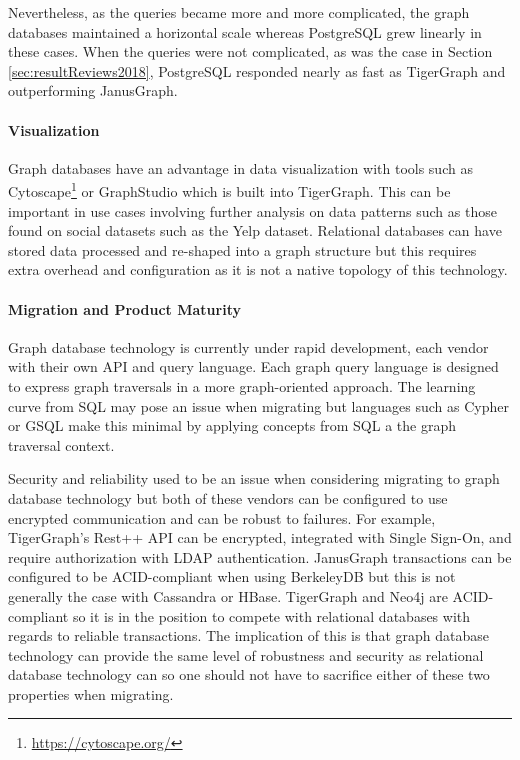 Nevertheless, as the queries became more and more complicated, the graph databases maintained a horizontal scale whereas PostgreSQL grew linearly in these cases. When the queries were not complicated, as was the case in Section \ref{sec:resultReviews2018}, PostgreSQL responded nearly as fast as TigerGraph and outperforming JanusGraph. 

\paragraph{Visualization}

Graph databases have an advantage in data visualization with tools such as Cytoscape\footnote{\url{https://cytoscape.org/}} or GraphStudio which is built into TigerGraph. This can be important in use cases involving further analysis on data patterns such as those found on social datasets such as the Yelp dataset. Relational databases can have stored data processed and re-shaped into a graph structure but this requires extra overhead and configuration as it is not a native topology of this technology.

\paragraph{Migration and Product Maturity}

Graph database technology is currently under rapid development, each vendor with their own API and query language. Each graph query language is designed to express graph traversals in a more graph-oriented approach. The learning curve from SQL may pose an issue when migrating but languages such as Cypher or GSQL make this minimal by applying concepts from SQL a the graph traversal context.

Security and reliability used to be an issue when considering migrating to graph database technology but both of these vendors can be configured to use encrypted communication and can be robust to failures. For example, TigerGraph's Rest++ API can be encrypted, integrated with Single Sign-On, and require authorization with LDAP authentication. JanusGraph transactions can be configured to be ACID-compliant when using BerkeleyDB but this is not generally the case with Cassandra or HBase. TigerGraph and Neo4j are ACID-compliant so it is in the position to compete with relational databases with regards to reliable transactions. The implication of this is that graph database technology can provide the same level of robustness and security as relational database technology can so one should not have to sacrifice either of these two properties when migrating.

